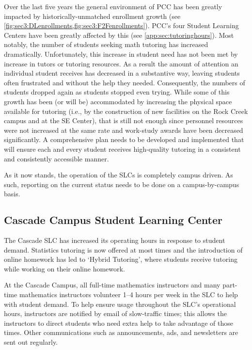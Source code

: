Over the last five years the general environment of PCC has been greatly
impacted by historically-unmatched enrollment growth (see \vref{fig:sec3:DLenrollments,fig:sec3:F2Fenrollments}). PCC's four Student
Learning Centers have been greatly affected by this (see \vref{app:sec:tutoringhours}).  
Most notably, the number of students seeking math tutoring has
increased dramatically.  Unfortunately, this increase in student need has not
been met by increase in tutors or tutoring resources.  As a result the
amount of attention an individual student receives has decreased in a
substantive way, leaving students often frustrated and without the help they needed. Consequently, the numbers of students dropped again as students stopped even trying.   While some of this growth has been (or will be) accommodated
by increasing the physical space available for tutoring (i.e., by the
construction of new facilities on the Rock Creek campus and at the SE Center),
that is still not enough since personnel resources were not increased at the same rate and work-study awards have been decreased significantly.  A comprehensive plan needs to be developed and implemented that will ensure each and every student receives high-quality tutoring in a consistent and consistently accessible manner.

As it now stands, the operation of the SLCs is completely campus driven.  As
such, reporting on the current status needs to be done on a campus-by-campus
basis.

\subsection{Cascade Campus Student Learning Center}
The Cascade SLC has increased its operating hours in response to student
demand. Statistics tutoring is now offered at most times and the introduction of
online homework has led to `Hybrid Tutoring', where students receive tutoring
while working on their online homework. 

At the Cascade Campus, all full-time mathematics instructors and many part-time
mathematics instructors volunteer 1--4 hours per week in the SLC to help with
student demand. To help ensure usage throughout the SLC's operational hours,
instructors are notified by email of slow-traffic times; this allows the
instructors to direct students who need extra help to take advantage of those
times. Other communications such as announcements, ads, and newsletters are
sent out regularly.

